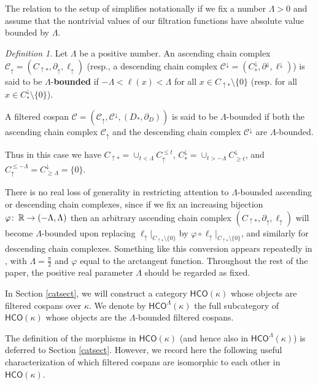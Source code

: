 \documentclass[11pt]{amsart}
\theoremstyle{definition}
\theoremstyle{remark}
\newtheorem{dfn}[theorem]{Definition}
\numberwithin{equation}{section}
\def\co{\colon\thinspace}
\def\R{\mathbb{R}}
\begin{document}
The relation to the setup of \cite{BBF20} simplifies notationally if we fix a number $\Lambda>0$ and assume that the nontrivial values of our filtration functions have absolute value bounded by $\Lambda$. 

\begin{dfn}\label{bounded-dfn} Let $\Lambda$ be a positive number.  An ascending chain complex $\mathcal{C}_{\uparrow}=(C_{\uparrow *},\partial_{\uparrow},\ell_{\uparrow})$ (resp., a descending chain complex $\mathcal{C}^{\downarrow}=(C^{\downarrow}_{*},\partial^{\downarrow},\ell^{\downarrow})$) is said to be $\Lambda$-\textbf{bounded} if $-\Lambda<\ell(x)<\Lambda$ for all $x\in C_{\uparrow *}\setminus\{0\}$ (resp. for all $x\in C^{\downarrow}_{*}\setminus\{0\}$).
	
A filtered cospan $\mathcal{C}=(\mathcal{C}_{\uparrow},\mathcal{C}^{\downarrow},(D_*,\partial_D))$ is said to be $\Lambda$-bounded if both the ascending chain complex $\mathcal{C}_{\uparrow}$ and the descending chain complex $\mathcal{C}^{\downarrow}$ are $\Lambda$-bounded.
\end{dfn}

	Thus in this case we have $C_{\uparrow *}=\cup_{t<\Lambda}C_{\uparrow}^{\leq t}$, $C_{*}^{\downarrow}=\cup_{t>-\Lambda} C^{\downarrow}_{\geq t}$, and $C_{\uparrow}^{\leq -\Lambda}=C^{\downarrow}_{\geq \Lambda}=\{0\}$.

	There is no real loss of generality in restricting attention to $\Lambda$-bounded ascending or descending chain complexes, since if we fix an increasing bijection $\varphi\co \R\to(-\Lambda,\Lambda)$ then an arbitrary ascending chain complex   $(C_{\uparrow *},\partial_{\uparrow},\ell_{\uparrow})$ will become $\Lambda$-bounded upon replacing $\ell_{\uparrow}|_{C_{\uparrow *}\setminus\{0\}}$ by $\varphi\circ\ell_{\uparrow}|_{C_{\uparrow *}\setminus\{0\}}$, and similarly for descending chain complexes.  Something like this conversion appears repeatedly in \cite{BBF20}, with $\Lambda=\frac{\pi}{2}$ and $\varphi$ equal to the arctangent function.
		Throughout the rest of the paper, the positive real parameter $\Lambda$ should be regarded as fixed.
	 
	

	
	In Section \ref{catsect}, we will construct a category $\mathsf{HCO}(\kappa)$ whose objects are filtered cospans over $\kappa$. We denote by $\mathsf{HCO}^{\Lambda}(\kappa)$ the full subcategory of $\mathsf{HCO}(\kappa)$ whose objects are the $\Lambda$-bounded filtered cospans. 
	
	The definition of the morphisms in $\mathsf{HCO}(\kappa)$ (and hence also in $\mathsf{HCO}^{\Lambda}(\kappa)$) is deferred to Section \ref{catsect}.
 However, we record here the following useful characterization of which filtered cospans are isomorphic to each other in $\mathsf{HCO}(\kappa)$.
	
\end{document}
